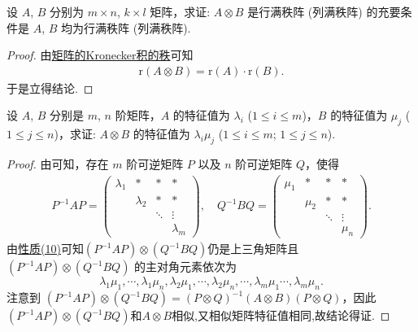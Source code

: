 \documentclass[../../main.tex]{subfiles}
\begin{document}
\begin{corollary}\label{corollary:矩阵的Kronecker积关于行列满秩阵的推论}
设 $A$, $B$ 分别为 $m\times n$, $k\times l$ 矩阵，求证: $A\otimes B$ 是行满秩阵 (列满秩阵) 的充要条件是 $A$, $B$ 均为行满秩阵 (列满秩阵). 
\end{corollary}
\begin{proof}
由\hyperref[proposition:矩阵的Kronecker积的秩]{矩阵的Kronecker积的秩}可知
\begin{align*}
\mathrm{r}\left( A\otimes B \right) =\mathrm{r}\left( A \right) \cdot \mathrm{r}\left( B \right) .
\end{align*}
于是立得结论.
\end{proof}

\begin{proposition}[矩阵的Kronecker积的特征值]\label{proposition:矩阵的Kronecker积的特征值}
设 $A$, $B$ 分别是 $m$, $n$ 阶矩阵，$A$ 的特征值为 $\lambda_i$ ($1\leq i\leq m$)，$B$ 的特征值为 $\mu_j$ ($1\leq j\leq n$)，求证: $A\otimes B$ 的特征值为 $\lambda_i\mu_j$ ($1\leq i\leq m$; $1\leq j\leq n$).
\end{proposition}
\begin{proof}
由可知，存在 $m$ 阶可逆矩阵 $P$ 以及 $n$ 阶可逆矩阵 $Q$，使得
\begin{align*}
P^{-1}AP = 
\begin{pmatrix}
\lambda_1 & * & * & * \\
& \lambda_2 & * & * \\
& & \ddots & \vdots \\
& & & \lambda_m
\end{pmatrix}, \quad 
Q^{-1}BQ = 
\begin{pmatrix}
\mu_1 & * & * & * \\
& \mu_2 & * & * \\
& & \ddots & \vdots \\
& & & \mu_n
\end{pmatrix}.
\end{align*}
由\hyperref[矩阵的Kronecker积的基本性质(10)]{性质(10)}可知$(P^{-1}AP)\otimes (Q^{-1}BQ)$仍是上三角矩阵且 $(P^{-1}AP)\otimes (Q^{-1}BQ)$ 的主对角元素依次为
\[
\lambda_1\mu_1,\cdots,\lambda_1\mu_n,\lambda_2\mu_1,\cdots,\lambda_2\mu_n,\cdots,\lambda_m\mu_1\cdots,\lambda_m\mu_n.
\]
注意到 $(P^{-1}AP)\otimes (Q^{-1}BQ)=(P\otimes Q)^{-1}(A\otimes B)(P\otimes Q)$，因此$(P^{-1}AP)\otimes (Q^{-1}BQ)$和$A\otimes B$相似,又相似矩阵特征值相同,故结论得证.
\end{proof}
\end{document}
